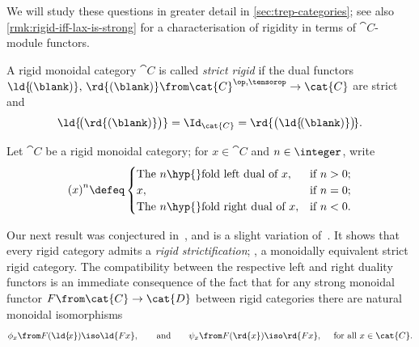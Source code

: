 We will study these questions in greater detail in \cref{sec:trep-categories};
see also \cref{rmk:rigid-iff-lax-is-strong}
for a characterisation of rigidity in terms of \(\cat{C}\)\hyp{}module functors.

\begin{definition}\label{def: stric_rigid_cat}
  A rigid monoidal category \(\cat{C}\) is called \emph{strict rigid}
  if the dual functors \(\ld{\!(\blank)},\,\rd{(\blank)}\from \cat{C}^{\op,\tensorop} \to \cat{C}\) are strict and
  \[
    \ld{\!\big(\rd{(\blank)}\big)} = \Id_{\cat{C}}
    = \rd{\big(\ld{\!(\blank)} \big)\!}.
  \]
\end{definition}

\begin{notation}\label{almostlisp}
  Let \(\cat{C}\) be a rigid monoidal category;
  for \(x \in \cat{C}\) and \(n \in \integer\), write
  \[
    {(x)}^{n} \defeq
    \begin{cases}
      \text{The \(n\)\hyp{}fold left dual of \(x\)}, & \text{if } n > 0; \\
      x, & \text{if } n = 0; \\
      \text{The \(n\)\hyp{}fold right dual of \(x\)}, & \text{if } n < 0.
    \end{cases}
  \]
\end{notation}

Our next result was conjectured in~\cite[Section 5]{Schauenburg2001},
and is a slight variation of~\cite[Theorem~2.2]{Ng2007}.
It shows that every rigid category admits a \emph{rigid strictification};
\ie, a monoidally equivalent strict rigid category.
The compatibility between the respective left and right duality functors is an immediate consequence of the fact that for any strong monoidal functor \(F \from \cat{C} \to \cat{D}\) between rigid categories there are natural monoidal isomorphisms
\[
  \phi_x \from F (\ld{\!x}) \iso \ld{Fx},
  \qquad\text{and}\qquad
  \psi_x \from F (\rd{x}) \iso \rd{Fx},
  \quad \text{ for all } x \in \cat{C}.
\]

